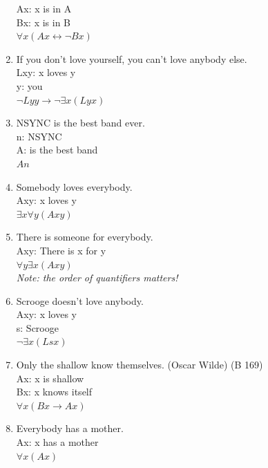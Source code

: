 \documentclass{article}
\begin{document}
\begin{enumerate}
          Ax: x is in A\\
          Bx: x is in B\\
          $\forall x(Ax \leftrightarrow \neg Bx)$
    \item If you don't love yourself, you can't love anybody else.\\
          Lxy: x loves y\\
          y: you\\
          $\neg Lyy \to \neg \exists x(Lyx)$
    \item NSYNC is the best band ever.\\
          n: NSYNC\\
          A: is the best band\\
          $An$
    \item Somebody loves everybody.\\
          Axy: x loves y\\
          $\exists x \forall y (Axy)$
    \item There is someone for everybody.\\
          Axy: There is x for y\\
          $\forall y \exists x(Axy)$\\
          \textit{Note: the order of quantifiers matters!}
    \item Scrooge doesn't love anybody.\\
          Axy: x loves y\\
          s: Scrooge\\
          $\neg \exists x (Lsx)$
    \item Only the shallow know themselves. (Oscar Wilde) (B 169)\\
          Ax: x is shallow\\
          Bx: x knows itself\\
          $\forall x(Bx \to Ax)$
    \item Everybody has a mother.\\
          Ax: x has a mother\\
          $\forall x(Ax)$
\end{enumerate}
\end{document}
